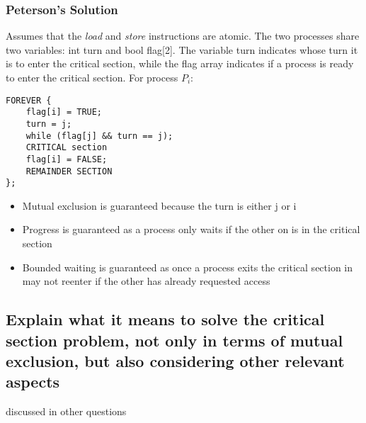 \documentclass{article}
\begin{document}
\subsubsection{Peterson's Solution}
Assumes that the \emph{load} and \emph{store} instructions are atomic. The two processes share two variables: int turn and bool flag[2]. The variable turn indicates whose turn it is to enter the critical section, while the flag array indicates if a process is ready to enter the critical section. For process $P_i$:
\begin{verbatim}
FOREVER {
    flag[i] = TRUE;
    turn = j;
    while (flag[j] && turn == j);
    CRITICAL section
    flag[i] = FALSE;
    REMAINDER SECTION
};
\end{verbatim}
\begin{itemize}
    \item Mutual exclusion is guaranteed because the turn is either j or i
    \item Progress is guaranteed as a process only waits if the other on is in the critical section
    \item Bounded waiting is guaranteed as once a process exits the critical section in may not reenter if the other has already requested access 
\end{itemize}



\subsection{Explain what it means to solve the critical section problem, not only in terms of mutual exclusion, but also considering other relevant aspects}
discussed in other questions
\end{document}
